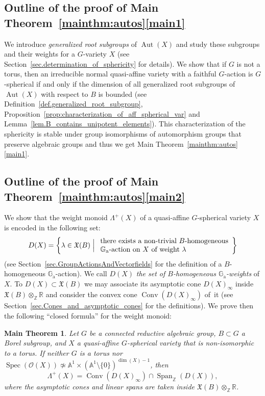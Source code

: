 \documentclass[JEP,XML,SOM,Unicode]{cedram}
\let\mathcal\mathscr
\newcommand{\ra}{\mathrm{a}}
\theoremstyle{plain}
\newtheorem{maintheorem}{Main Theorem}
\theoremstyle{definition}
\DeclareMathOperator{\Aut}{Aut}
\DeclareMathOperator{\Spec}{Spec}
\DeclareMathOperator{\Conv}{Conv}
\DeclareMathOperator{\Span}{Span}
\newcommand{\OO}{\mathcal{O}}
\newcommand{\GG}{\mathbb{G}}
\newcommand{\RR}{\mathbb{R}}
\newcommand{\ZZ}{\mathbb{Z}}
\renewcommand{\AA}{\mathbb{A}}
\newcommand{\Bigset}[2]{\biggl\{#1 \Bigm|  #2\biggr\}}
\begin{document}
\subsection*{Outline of the proof of Main Theorem~\ref{mainthm:autos}\eqref{main1}}
We introduce \emph{generalized root subgroups} of $\Aut(X)$ and study these subgroups and
their weights for a $G$-variety $X$ (see Section~\ref{sec.determination_of_sphericity} for details).
We show that if $G$ is not a torus,
then an irreducible normal quasi-affine variety with a faithful $G$-action is
$G$-spherical if and only if the dimension of all
generalized root subgroups of $\Aut(X)$ with respect to $B$
is bounded (see Definition~\ref{def.generalized_root_subgroup}, Proposition~\ref{prop:characterization_of_aff_spherical_var} and Lemma~\ref{lem.B_contains_unipotent_elements}). This characterization of the sphericity
is stable under
group isomorphisms of automorphism groups that preserve algebraic groups
and thus we get Main Theorem~\ref{mainthm:autos}\eqref{main1}.

\subsection*{Outline of the proof of Main Theorem~\ref{mainthm:autos}\eqref{main2}}
We show
that the weight monoid $\Lambda^+(X)$ of a quasi-affine
$G$-spherical variety $X$ is encoded in
the following set:
\[
D(X) = \Bigset{ \lambda \in \mathfrak{X}(B)}{
\begin{array}{l}
\textrm{there exists a non-trivial $B$-homogeneous} \\
\textrm{$\GG_\ra$-action on $X$ of weight $\lambda$}
\end{array}
}
\]
(see Section~\ref{sec.GroupActionsAndVectorfields} for the definition of a $B$-homogeneous $\GG_\ra$-action). We call $D(X)$ \emph{the set of $B$-homogeneous $\GG_\ra$-weights} of $X$.
To $D(X) \subset \mathfrak{X}(B)$ we may associate its asymp\-totic cone $D(X)_{\infty}$ inside
$\mathfrak{X}(B) \otimes_\ZZ \RR$ and consider the convex cone $\Conv ( D(X)_{\infty})$
of~it (see Section~\ref{sec.Cones_and_asymptotic_cones} for the definitions).
We prove then the following ``closed formula'' for the weight monoid:

\begin{maintheorem}
\label{mainthm:closed_formula}
Let $G$ be a connected reductive algebraic group, $B \subset G$ a Borel subgroup, and
$X$ a quasi-affine $G$-spherical variety that is non-isomorphic to a torus.
If neither $G$ is a torus nor $\Spec(\OO(X)) \not\simeq \AA^1 \times (\AA^1 \setminus \{0\})^{\dim(X)-1}$, then
\[
\Lambda^+(X) = \Conv ( D(X)_{\infty}) \cap \Span_{\ZZ}(D(X)),
\]
where the asymptotic cones and linear spans are taken inside $\mathfrak{X}(B) \otimes_{\ZZ} \RR$.
\end{maintheorem}
\end{document}
